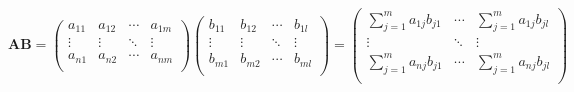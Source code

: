 \begin{equation*}
	\bm{A} \bm{B} =
	\begin{pmatrix}
		a_{11} & a_{12} & \cdots & a_{1m} \\
		\vdots & \vdots & \ddots & \vdots \\
		a_{n1} & a_{n2} & \cdots & a_{nm} \\
	\end{pmatrix}
	\begin{pmatrix}
		b_{11} & b_{12} & \cdots & b_{1l} \\
		\vdots & \vdots & \ddots & \vdots \\
		b_{m1} & b_{m2} & \cdots & b_{ml} \\
	\end{pmatrix}
	=
	\begin{pmatrix}
		\sum_{j=1}^{m} a_{1j} b_{j1} & \cdots & \sum_{j=1}^{m} a_{1j} b_{jl} \\
		\vdots                       & \ddots & \vdots                       \\
		\sum_{j=1}^{m} a_{nj} b_{j1} & \cdots & \sum_{j=1}^{m} a_{nj} b_{jl} \\
	\end{pmatrix}
\end{equation*}

